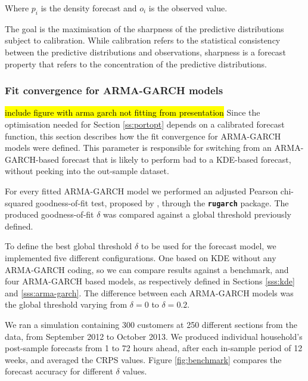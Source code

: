 \documentclass[preprint,3p,12pt,authoryear]{elsarticle}
\begin{document}
Where $p_i$ is the density forecast and $o_i$ is the observed value.

The goal is the maximisation of the sharpness of the predictive distributions subject to calibration.
While calibration refers to the statistical consistency between the predictive distributions and observations, sharpness is a forecast property that refers to the concentration of the predictive distributions.

\subsubsection{Fit convergence for ARMA-GARCH models}
\label{sss:gof.min}
\hl{include figure with arma garch not fitting from presentation}
Since the optimisation needed for Section \ref{ss:portopt} depends on a calibrated forecast function, this section describes how the fit convergence for ARMA-GARCH models were defined.
This parameter is responsible for switching from an ARMA-GARCH-based forecast that is likely to perform bad to a KDE-based forecast, without peeking into the out-sample dataset.

For every fitted ARMA-GARCH model we performed an adjusted Pearson chi-squared goodness-of-fit test, proposed by \citet{vlaarpalm_gof}, through the \texttt{\textbf{rugarch}} package.
The produced goodness-of-fit $\delta$ was compared against a global threshold previously defined.

To define the best global threshold $\delta$ to be used for the forecast model, we implemented five different configurations.
One based on KDE without any ARMA-GARCH coding, so we can compare results against a benchmark, and four ARMA-GARCH based models, as respectively defined in Sections \ref{sss:kde} and \ref{sss:arma-garch}.
The difference between each ARMA-GARCH models was the global threshold varying from $\delta = 0$ to $\delta = 0.2$.

We ran a simulation containing 300 customers at 250 different sections from the data, from September 2012 to October 2013.
We produced individual household's post-sample forecasts from 1 to 72 hours ahead, after each in-sample period of 12 weeks, and averaged the CRPS values.
Figure \ref{fig:benchmark} compares the forecast accuracy for different $\delta$ values.
\end{document}
